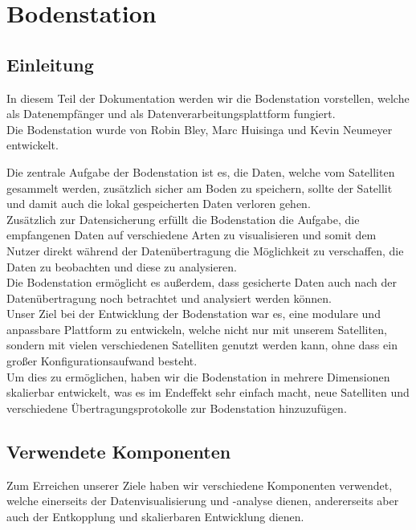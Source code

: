 \section{Bodenstation}
\subsection{Einleitung}
In diesem Teil der Dokumentation werden wir die Bodenstation vorstellen, welche als Datenempfänger und als Datenverarbeitungsplattform fungiert. \\
Die Bodenstation wurde von Robin Bley, Marc Huisinga und Kevin Neumeyer entwickelt.

Die zentrale Aufgabe der Bodenstation ist es, die Daten, welche vom Satelliten gesammelt werden, zusätzlich sicher am Boden zu speichern, sollte der Satellit und damit auch die lokal gespeicherten Daten verloren gehen. \\
Zusätzlich zur Datensicherung erfüllt die Bodenstation die Aufgabe, die empfangenen Daten auf verschiedene Arten zu visualisieren und somit dem Nutzer direkt während der Datenübertragung die Möglichkeit zu verschaffen, die Daten zu beobachten und diese zu analysieren. \\
Die Bodenstation ermöglicht es außerdem, dass gesicherte Daten auch nach der Datenübertragung noch betrachtet und analysiert werden können. \\
Unser Ziel bei der Entwicklung der Bodenstation war es, eine modulare und anpassbare Plattform zu entwickeln, welche nicht nur mit unserem Satelliten, sondern mit vielen verschiedenen Satelliten genutzt werden kann, ohne dass ein großer Konfigurationsaufwand besteht. \\
Um dies zu ermöglichen, haben wir die Bodenstation in mehrere Dimensionen skalierbar entwickelt, was es im Endeffekt sehr einfach macht, neue Satelliten und verschiedene Übertragungsprotokolle zur Bodenstation hinzuzufügen.

\subsection{Verwendete Komponenten}
Zum Erreichen unserer Ziele haben wir verschiedene Komponenten verwendet, welche einerseits der Datenvisualisierung und -analyse dienen, andererseits aber auch der Entkopplung und skalierbaren Entwicklung dienen.

